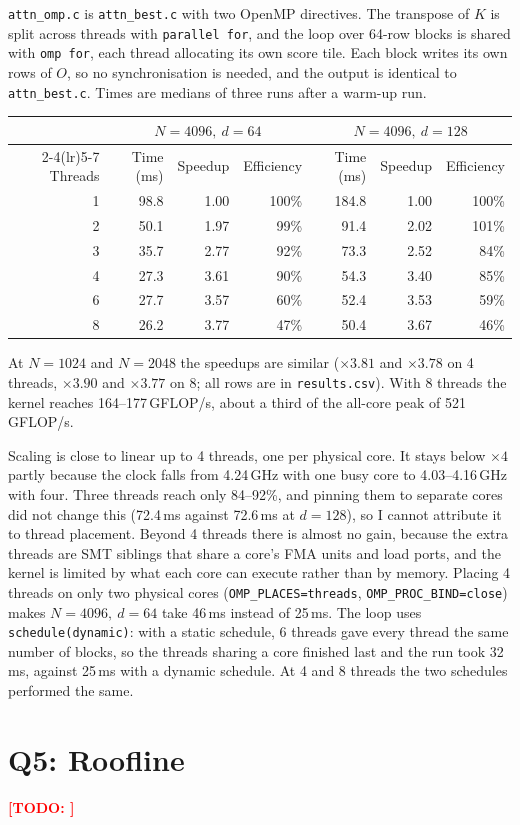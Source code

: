 \documentclass[11pt,a4paper]{article}
\newcommand{\todo}[1]{\textcolor{red}{\textbf{[TODO: #1]}}}
\begin{document}
\texttt{attn\_omp.c} is \texttt{attn\_best.c} with two OpenMP directives. The transpose of $K$
is split across threads with \texttt{parallel for}, and the loop over 64-row blocks is shared
with \texttt{omp for}, each thread allocating its own score tile. Each block writes its own rows
of $O$, so no synchronisation is needed, and the output is identical to \texttt{attn\_best.c}.
Times are medians of three runs after a warm-up run.

\begin{center}
\begin{tabular}{@{}r rrr rrr@{}}
\toprule
 & \multicolumn{3}{c}{$N=4096,\ d=64$} & \multicolumn{3}{c}{$N=4096,\ d=128$} \\
\cmidrule(lr){2-4}\cmidrule(lr){5-7}
Threads & Time (ms) & Speedup & Efficiency & Time (ms) & Speedup & Efficiency \\
\midrule
1 & 98.8 & 1.00 & 100\% & 184.8 & 1.00 & 100\% \\
2 & 50.1 & 1.97 & 99\%  & 91.4  & 2.02 & 101\% \\
3 & 35.7 & 2.77 & 92\%  & 73.3  & 2.52 & 84\%  \\
4 & 27.3 & 3.61 & 90\%  & 54.3  & 3.40 & 85\%  \\
6 & 27.7 & 3.57 & 60\%  & 52.4  & 3.53 & 59\%  \\
8 & 26.2 & 3.77 & 47\%  & 50.4  & 3.67 & 46\%  \\
\bottomrule
\end{tabular}
\end{center}

\noindent At $N=1024$ and $N=2048$ the speedups are similar ($\times3.81$ and $\times3.78$ on 4
threads, $\times3.90$ and $\times3.77$ on 8; all rows are in \texttt{results.csv}). With 8
threads the kernel reaches 164--177\,GFLOP/s, about a third of the all-core peak of
521\,GFLOP/s.

Scaling is close to linear up to 4 threads, one per physical core. It stays below $\times4$
partly because the clock falls from 4.24\,GHz with one busy core to 4.03--4.16\,GHz with four.
Three threads reach only 84--92\%, and pinning them to separate cores did not change this
(72.4\,ms against 72.6\,ms at $d=128$), so I cannot attribute it to thread placement. Beyond 4
threads there is almost no gain, because the extra threads are SMT siblings that share a core's
FMA units and load ports, and the kernel is limited by what each core can execute rather than
by memory. Placing 4
threads on only two physical cores (\texttt{OMP\_PLACES=threads}, \texttt{OMP\_PROC\_BIND=close})
makes $N=4096,\ d=64$ take 46\,ms instead of 25\,ms. The loop uses
\texttt{schedule(dynamic)}: with a static schedule, 6 threads gave every thread the same number
of blocks, so the threads sharing a core finished last and the run took 32\,ms, against 25\,ms
with a dynamic schedule. At 4 and 8 threads the two schedules performed the same.

\section*{Q5: Roofline}
\todo{}
\end{document}
